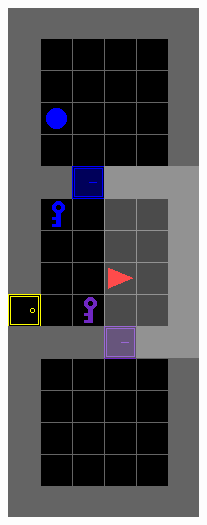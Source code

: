 \documentclass{article}
\begin{document}
\begin{figure}[H]
\begin{subfigure}[b]{0.6\linewidth}
\begin{subfigure}[b]{0.32\linewidth}
    \includegraphics[width=\linewidth]{Tasks/ObstructedMaze/2Dl}

\end{subfigure}
\end{subfigure}
\end{figure}
\end{document}
